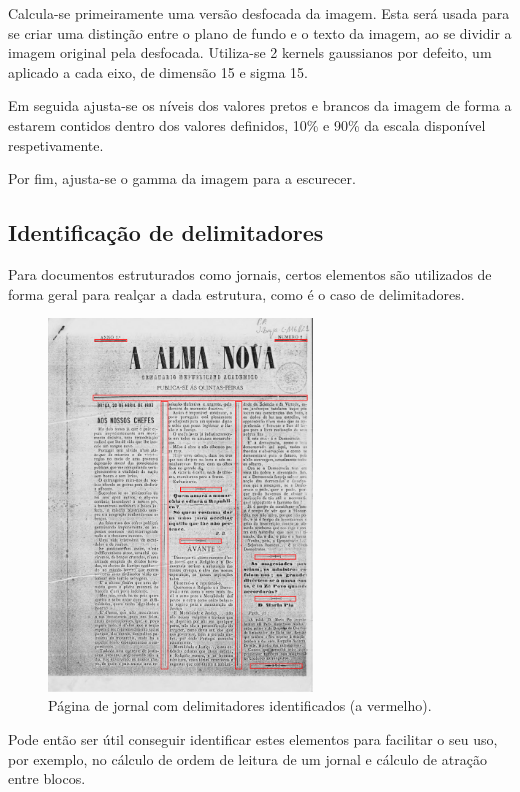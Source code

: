 Calcula-se primeiramente uma versão desfocada da imagem. Esta será usada para se criar uma distinção entre o plano de fundo e o texto da imagem, ao se dividir a imagem original pela desfocada. Utiliza-se 2 kernels gaussianos por defeito, um aplicado a cada eixo, de dimensão 15 e sigma 15.

Em seguida ajusta-se os níveis dos valores pretos e brancos da imagem de forma a estarem contidos dentro dos valores definidos, 10\% e 90\% da escala disponível respetivamente. 

Por fim, ajusta-se o gamma da imagem para a escurecer.


\subsection{Identificação de delimitadores}
\label{contribution_image_delimiter_identification}

Para documentos estruturados como jornais, certos elementos são utilizados de forma geral para realçar a dada estrutura, como é o caso de delimitadores.


\begin{figure}[H]
	\centering
	\includegraphics[width=7cm]{images/ilustracoes/document_delimiters.png}
	\caption{Página de jornal com delimitadores identificados (a vermelho).}
	\label{fig:document_delimiters_example}
\end{figure}

Pode então ser útil conseguir identificar estes elementos para facilitar o seu uso, por exemplo, no cálculo de ordem de leitura de um jornal e cálculo de atração entre blocos.

